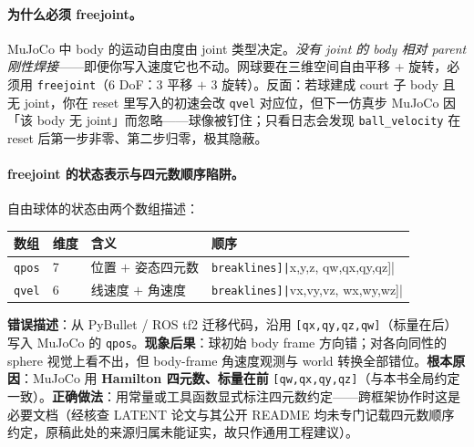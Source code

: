 \paragraph{为什么必须 freejoint。}MuJoCo 中 body 的运动自由度由 joint 类型决定。\emph{没有 joint 的 body 相对 parent 刚性焊接}——即便你写入速度它也不动。网球要在三维空间自由平移 + 旋转，必须用 \verb|freejoint|（$6$ DoF：$3$ 平移 $+$ $3$ 旋转）。反面：若球建成 court 子 body 且无 joint，你在 reset 里写入的初速会改 \verb|qvel| 对应位，但下一仿真步 MuJoCo 因「该 body 无 joint」而忽略——球像被钉住；只看日志会发现 \verb|ball_velocity| 在 reset 后第一步非零、第二步归零，极其隐蔽。

\paragraph{freejoint 的状态表示与四元数顺序陷阱。}自由球体的状态由两个数组描述：

\begin{center}
\small
\begin{tabular}{@{}llll@{}}
\toprule
数组 & 维度 & 含义 & 顺序 \\
\midrule
\verb|qpos| & 7 & 位置 $+$ 姿态四元数 & \Verb[breaklines]|[x,y,z, qw,qx,qy,qz]| \\
\verb|qvel| & 6 & 线速度 $+$ 角速度 & \Verb[breaklines]|[vx,vy,vz, wx,wy,wz]| \\
\bottomrule
\end{tabular}
\end{center}

\begin{pitfall}
\textbf{错误描述}：从 PyBullet / ROS tf2 迁移代码，沿用 \verb|[qx,qy,qz,qw]|（标量在后）写入 MuJoCo 的 \verb|qpos|。\textbf{现象后果}：球初始 body frame 方向错；对各向同性的 sphere 视觉上看不出，但 body-frame 角速度观测与 world 转换全部错位。\textbf{根本原因}：MuJoCo 用 \textbf{Hamilton 四元数、标量在前} \verb|[qw,qx,qy,qz]|（与本书全局约定一致）。\textbf{正确做法}：用常量或工具函数显式标注四元数约定——跨框架协作时这是必要文档（经核查 LATENT 论文与其公开 README 均未专门记载四元数顺序约定，原稿此处的来源归属未能证实，故只作通用工程建议）。
\end{pitfall}

